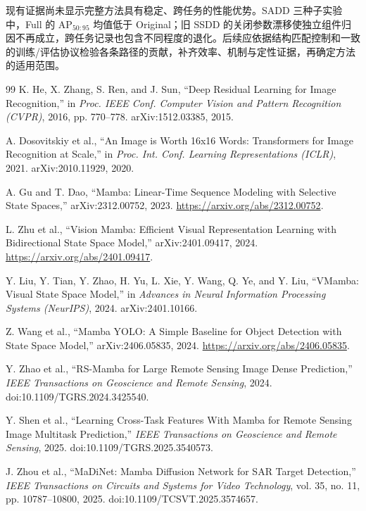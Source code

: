 \documentclass[journal]{IEEEtran}
\begin{document}
现有证据尚未显示完整方法具有稳定、跨任务的性能优势。SADD 三种子实验中，Full 的 AP$_{50:95}$ 均值低于 Original；旧 SSDD 的关闭参数漂移使独立组件归因不再成立，跨任务记录也包含不同程度的退化。后续应依据结构匹配控制和一致的训练/评估协议检验各条路径的贡献，补齐效率、机制与定性证据，再确定方法的适用范围。

\begin{thebibliography}{99}
K. He, X. Zhang, S. Ren, and J. Sun, ``Deep Residual Learning for Image Recognition,'' in \emph{Proc. IEEE Conf. Computer Vision and Pattern Recognition (CVPR)}, 2016, pp. 770--778. arXiv:1512.03385, 2015.

A. Dosovitskiy et al., ``An Image is Worth 16x16 Words: Transformers for Image Recognition at Scale,'' in \emph{Proc. Int. Conf. Learning Representations (ICLR)}, 2021. arXiv:2010.11929, 2020.

A. Gu and T. Dao, ``Mamba: Linear-Time Sequence Modeling with Selective State Spaces,'' arXiv:2312.00752, 2023. \url{https://arxiv.org/abs/2312.00752}.

L. Zhu et al., ``Vision Mamba: Efficient Visual Representation Learning with Bidirectional State Space Model,'' arXiv:2401.09417, 2024. \url{https://arxiv.org/abs/2401.09417}.

Y. Liu, Y. Tian, Y. Zhao, H. Yu, L. Xie, Y. Wang, Q. Ye, and Y. Liu, ``VMamba: Visual State Space Model,'' in \emph{Advances in Neural Information Processing Systems (NeurIPS)}, 2024. arXiv:2401.10166.

Z. Wang et al., ``Mamba YOLO: A Simple Baseline for Object Detection with State Space Model,'' arXiv:2406.05835, 2024. \url{https://arxiv.org/abs/2406.05835}.

Y. Zhao et al., ``RS-Mamba for Large Remote Sensing Image Dense Prediction,'' \emph{IEEE Transactions on Geoscience and Remote Sensing}, 2024. doi:10.1109/TGRS.2024.3425540.

Y. Shen et al., ``Learning Cross-Task Features With Mamba for Remote Sensing Image Multitask Prediction,'' \emph{IEEE Transactions on Geoscience and Remote Sensing}, 2025. doi:10.1109/TGRS.2025.3540573.

J. Zhou et al., ``MaDiNet: Mamba Diffusion Network for SAR Target Detection,'' \emph{IEEE Transactions on Circuits and Systems for Video Technology}, vol. 35, no. 11, pp. 10787--10800, 2025. doi:10.1109/TCSVT.2025.3574657.


\end{thebibliography}
\end{document}
